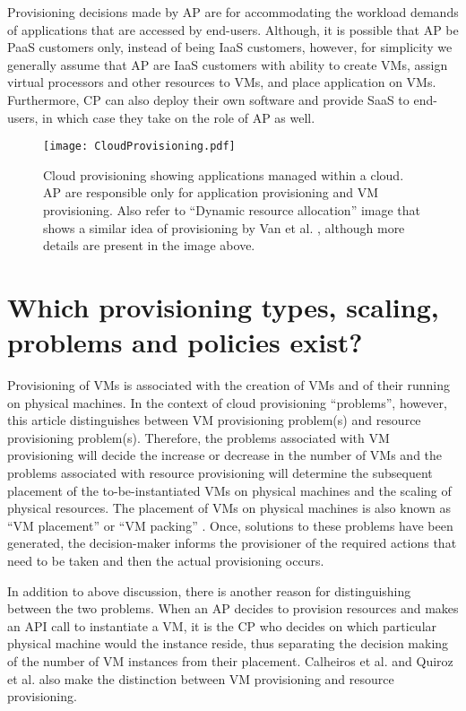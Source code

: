 \documentclass[10pt,journal,cspaper,compsoc]{IEEEtran}
\begin{document}
Provisioning decisions made by AP are for accommodating the workload demands of applications that are accessed by end-users. Although, it is possible that AP be PaaS customers only, instead of being IaaS customers, however, for simplicity we generally assume that AP are IaaS customers with ability to create VMs, assign virtual processors and other resources to VMs, and place application on VMs. Furthermore, CP can also deploy their own software and provide SaaS to end-users, in which case they take on the role of AP as well.


\begin{figure*}[ht]
\centering
\texttt{[image: CloudProvisioning.pdf]}
\caption[Cloud Provisioning]{Cloud provisioning showing applications managed within a cloud. AP are responsible only for application provisioning and VM provisioning. Also refer to ``Dynamic resource allocation'' image that shows a similar idea of  provisioning by Van et al. \cite{2009_AutoVMManagement_NguyenVan}, although more details are present in the image above.}
\label{fig:CloudProv}
\end{figure*}

\section{Which provisioning types, scaling, problems and policies exist?}
\label{sec:CloudProvTypesProbPolicies}
Provisioning of VMs is associated with the creation of VMs and of their running on physical machines. In the context of cloud provisioning ``problems'', however, this article distinguishes between VM provisioning problem(s) and resource provisioning problem(s). Therefore, the problems associated with VM provisioning will decide the increase or decrease in the number of VMs and the problems associated with resource provisioning will determine the subsequent placement of the to-be-instantiated VMs on physical machines and the scaling of physical resources. The placement of VMs on physical machines is also known as ``VM placement'' \cite{2009_AutoVMManagement_NguyenVan, iqbal2010sla6} or ``VM packing'' \cite{2009_AutoVMManagement_NguyenVan}. Once, solutions to these problems have been generated, the decision-maker informs the provisioner of the required actions that need to be taken and then the actual provisioning occurs. 

In addition to above discussion, there is another reason for distinguishing between the two problems. When an AP decides to provision resources and makes an API call to instantiate a VM, it is the CP who decides on which particular physical machine would the instance reside, thus separating the decision making of the number of VM instances from their placement. Calheiros et al. \cite{calheirosvirtual3} and Quiroz et al. \cite{2009_TowardWorkloadProvCloud} also make the distinction between VM provisioning and resource provisioning. 
\end{document}
